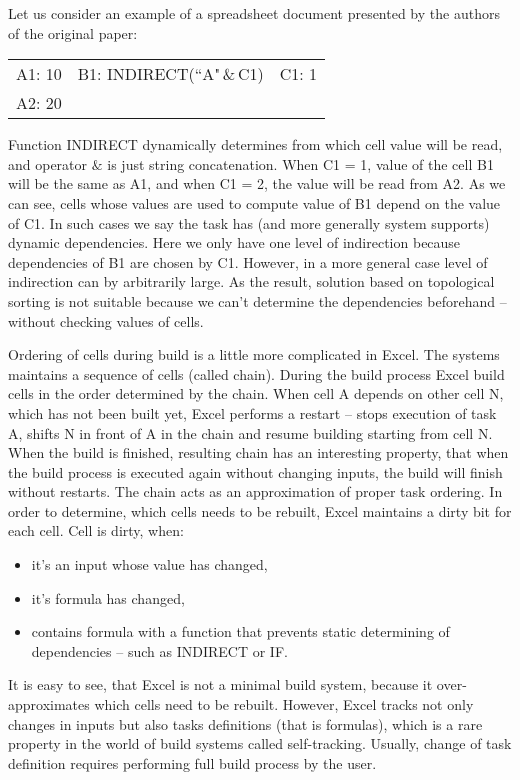 Let us consider an example of a spreadsheet document presented by the authors of the original paper:

\begin{tabular}{ l c r }
  A1: 10 & B1: INDIRECT(``A"\,\&\,C1) & C1: 1 \\
  A2: 20 & &
\end{tabular}

Function INDIRECT dynamically determines from which cell value will be read, and operator \(\&\) is just string concatenation. When C1 = 1, value of the cell B1 will be the same as A1, and when C1 = 2, the value will be read from A2. As we can see, cells whose values are used to compute value of B1 depend on the value of C1. In such cases we say the task has (and more generally system supports) dynamic dependencies. Here we only have one level of indirection because dependencies of B1 are chosen by C1. However, in a more general case level of indirection can by arbitrarily large. As the result, solution based on topological sorting is not suitable because we can't determine the dependencies beforehand -- without checking values of cells.

Ordering of cells during build is a little more complicated in Excel. The systems maintains a sequence of cells (called chain). During the build process Excel build cells in the order determined by the chain. When cell A depends on other cell N, which has not been built yet, Excel performs a restart -- stops execution of task A, shifts N in front of A in the chain and resume building starting from cell N. When the build is finished, resulting chain has an interesting property, that when the build process is executed again without changing inputs, the build will finish without restarts. The chain acts as an approximation of proper task ordering. In order to determine, which cells needs to be rebuilt, Excel maintains a dirty bit for each cell. Cell is dirty, when:
\begin{itemize}
\item it's an input whose value has changed,
\item it's formula has changed, 
\item contains formula with a function that prevents static determining of dependencies -- such as INDIRECT or IF.
\end{itemize}

\pagebreak

It is easy to see, that Excel is not a minimal build system, because it over-approximates which cells need to be rebuilt. However, Excel tracks not only changes in inputs but also tasks definitions (that is formulas), which is a rare property in the world of build systems called self-tracking. Usually, change of task definition requires performing full build process by the user.

